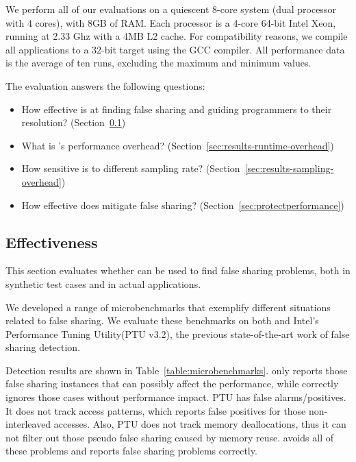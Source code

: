\label{sec:evaluation}

We perform all of our evaluations on a quiescent 8-core system (dual processor with 4 cores), with 8GB of RAM. Each processor is a 4-core 64-bit Intel Xeon, running at 2.33 Ghz with a 4MB L2 cache. For compatibility reasons, we compile all applications to a 32-bit target using the GCC compiler. All performance data is the average of ten runs, excluding the maximum and minimum values.

The evaluation answers the following questions:

\begin{itemize}
\item How effective is \sheriffdetect{} at finding false sharing and guiding programmers to their resolution? (Section~\ref{sec:effecteval})
\item What is \sheriffdetect{}'s performance overhead? (Section~\ref{sec:results-runtime-overhead})
\item How sensitive is \sheriffdetect{} to different sampling rate? (Section~\ref{sec:results-sampling-overhead}) 
\item How effective does \sheriffprotect{} mitigate false sharing? (Section~\ref{sec:protectperformance})
\end{itemize}

\subsection{\sheriffdetect{} Effectiveness}

\label{sec:effecteval}

This section evaluates whether \sheriffdetect{} can be used to find false sharing problems, both in synthetic test cases and in actual applications.

We developed a range of microbenchmarks that exemplify different situations related to false sharing. We evaluate these benchmarks on both \SheriffDetect{} and Intel's Performance Tuning Utility(PTU v3.2), the previous state-of-the-art work of false sharing detection. 

Detection results are shown in Table~\ref{table:microbenchmarks}. \sheriffdetect{} only reports those false sharing instances that can possibly affect the performance, while correctly ignores those cases without performance impact.
PTU has false alarms/positives.  It does not track access patterns, which reports false positives for those non-interleaved accesses. Also, PTU does not track memory deallocations, thus it can not filter out those pseudo false sharing caused by memory reuse. \sheriffdetect{} avoids all of these problems and reports false sharing problems correctly. 


